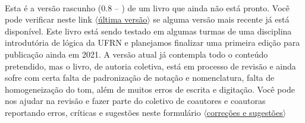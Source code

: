 \thispagestyle{empty}
\onecolumn
\ 
\vfill

\parbox{3 in}{
Esta é a versão rascunho (0.8 -- \mydate) de um livro que ainda não está pronto.
Você pode verificar neste link
\href{https://github.com/Grupo-de-Estudos-em-Logica-da-UFRN/Para-Todxs-Natal/blob/main/paratodxsnatal.pdf}{$\langle$última versão$\rangle$}
se alguma versão mais recente já está disponível.
Este livro está sendo testado em algumas turmas de uma disciplina introdutória de lógica da UFRN e planejamos finalizar uma primeira edição para publicação ainda em 2021. 
A versão atual já contempla todo o conteúdo pretendido, mas o livro, de autoria coletiva, está em processo de revisão e ainda sofre com certa falta de padronização de notação e nomenclatura, falta de homogeneização do tom, além de muitos erros de escrita e digitação.
Você pode nos ajudar na revisão e fazer parte do coletivo de coautores e coautoras reportando erros, críticas e sugestões neste formulário
\href{https://forms.gle/yd4yH9WAo6TxAiSj8}{$\langle$correções e sugestões$\rangle$}
}

\vfill

\parbox{3 in}{

}
\vfill
